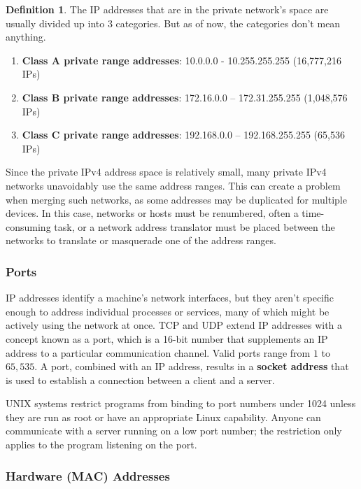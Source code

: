 \documentclass{article}
\theoremstyle{definition}
\newtheorem{definition}{Definition}[section]
\begin{document}
      \begin{definition}
        The IP addresses that are in the private network's space are usually divided up into 3 categories. But as of now, the categories don't mean anything. 

        \begin{enumerate}
          \item \textbf{Class A private range addresses}: 10.0.0.0 - 10.255.255.255 (16,777,216 IPs)
          \item \textbf{Class B private range addresses}: 172.16.0.0 – 172.31.255.255 (1,048,576 IPs)
          \item \textbf{Class C private range addresses}: 192.168.0.0 – 192.168.255.255 (65,536 IPs)
        \end{enumerate}

        Since the private IPv4 address space is relatively small, many private IPv4 networks unavoidably use the same address ranges. This can create a problem when merging such networks, as some addresses may be duplicated for multiple devices. In this case, networks or hosts must be renumbered, often a time-consuming task, or a network address translator must be placed between the networks to translate or masquerade one of the address ranges. 
      \end{definition}


    \subsubsection{Ports}

      IP addresses identify a machine's network interfaces, but they aren't specific enough to address individual processes or services, many of which might be actively using the network at once. TCP and UDP extend IP addresses with a concept known as a port, which is a 16-bit number that supplements an IP address to a particular communication channel. Valid ports range from $1$ to $65,535$. A port, combined with an IP address, results in a \textbf{socket address} that is used to establish a connection between a client and a server. 

      UNIX systems restrict programs from binding to port numbers under 1024 unless they are run as root or have an appropriate Linux capability. Anyone can communicate with a server running on a low port number; the restriction only applies to the program listening on the port.

    \subsubsection{Hardware (MAC) Addresses}
\end{document}
